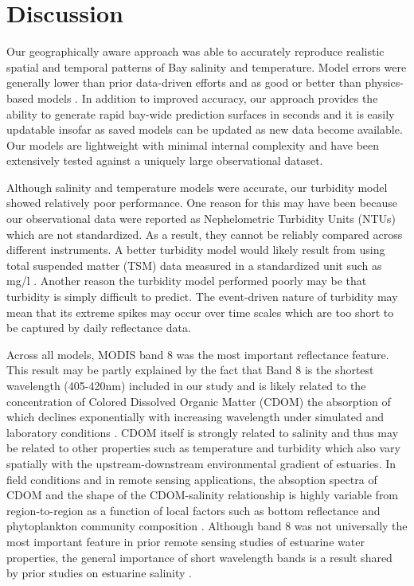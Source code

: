 \documentclass{article}
\begin{document}
\section{Discussion}

Our geographically aware approach was able to accurately reproduce realistic spatial and temporal patterns of Bay salinity and temperature. Model errors were generally lower than prior data-driven efforts and as good or better than physics-based models \cite{vogelAssessingSatelliteSea2016}. In addition to improved accuracy, our approach provides the ability to generate rapid bay-wide prediction surfaces in seconds and it is easily updatable insofar as saved models can be updated as new data become available. Our models are lightweight with minimal internal complexity and have been extensively tested against a uniquely large observational dataset.

Although salinity and temperature models were accurate, our turbidity model showed relatively poor performance. One reason for this may have been because our observational data were reported as Nephelometric Turbidity Units (NTUs) which are not standardized. As a result, they cannot be reliably compared across different instruments. A better turbidity model would likely result from using total suspended matter (TSM) data measured in a standardized unit such as mg/l \cite{ondrusekDevelopmentNewOptical2012}. Another reason the turbidity model performed poorly may be that turbidity is simply difficult to predict. The event-driven nature of turbidity may mean that its extreme spikes may occur over time scales which are too short to be captured by daily reflectance data.

Across all models, MODIS band 8 was the most important reflectance feature. This result may be partly explained by the fact that Band 8 is the shortest wavelength (405-420nm) included in our study and is likely related to the concentration of Colored Dissolved Organic Matter (CDOM) the absorption of which declines exponentially with increasing wavelength under simulated and laboratory conditions \cite{loiselleOpticalCharacterizationChromophoric2009, sathyendranath2000remote}. CDOM itself is strongly related to salinity \cite{sathyendranath2000remote, vogelAssessingSatelliteSea2016, wangDevelopmentMODISData2018} and thus may be related to other properties such as temperature and turbidity which also vary spatially with the upstream-downstream environmental gradient of estuaries. In field conditions and in remote sensing applications, the absoption spectra of CDOM and the shape of the CDOM-salinity relationship is highly variable from region-to-region as a function of local factors such as bottom reflectance and phytoplankton community composition \cite{sathyendranath2000remote}. Although band 8 was not universally the most important feature in prior remote sensing studies of estuarine water properties, the general importance of short wavelength bands is a result shared by prior studies on estuarine salinity \cite{wangDevelopmentMODISData2018}.
\end{document}
